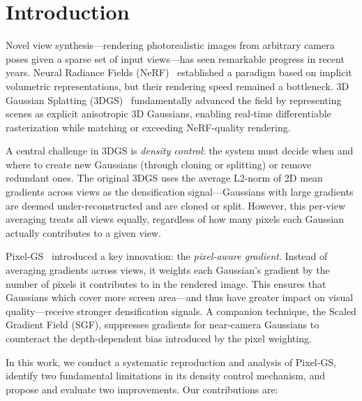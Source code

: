\documentclass[conference]{IEEEtran}
\begin{document}
\section{Introduction}

Novel view synthesis—rendering photorealistic images from arbitrary camera poses given a sparse set of input views—has seen remarkable progress in recent years. Neural Radiance Fields (NeRF)~\cite{mildenhall2020nerf} established a paradigm based on implicit volumetric representations, but their rendering speed remained a bottleneck. 3D Gaussian Splatting (3DGS)~\cite{kerbl2023gaussian} fundamentally advanced the field by representing scenes as explicit anisotropic 3D Gaussians, enabling real-time differentiable rasterization while matching or exceeding NeRF-quality rendering.

A central challenge in 3DGS is \emph{density control}: the system must decide when and where to create new Gaussians (through cloning or splitting) or remove redundant ones. The original 3DGS uses the average L2-norm of 2D mean gradients across views as the densification signal—Gaussians with large gradients are deemed under-reconstructed and are cloned or split. However, this per-view averaging treats all views equally, regardless of how many pixels each Gaussian actually contributes to a given view.

Pixel-GS~\cite{zhang2024pixelgs} introduced a key innovation: the \emph{pixel-aware gradient}. Instead of averaging gradients across views, it weights each Gaussian's gradient by the number of pixels it contributes to in the rendered image. This ensures that Gaussians which cover more screen area—and thus have greater impact on visual quality—receive stronger densification signals. A companion technique, the Scaled Gradient Field (SGF), suppresses gradients for near-camera Gaussians to counteract the depth-dependent bias introduced by the pixel weighting.

In this work, we conduct a systematic reproduction and analysis of Pixel-GS, identify two fundamental limitations in its density control mechanism, and propose and evaluate two improvements. Our contributions are:
\end{document}
